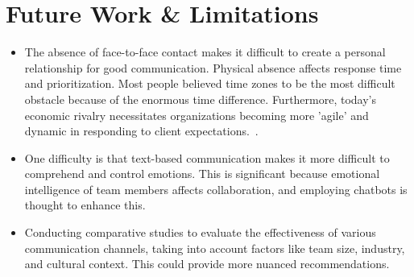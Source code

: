\documentclass{llncs}
\begin{document}
\section{Future Work \& Limitations}

\begin{itemize}

\item The absence of face-to-face contact makes it difficult to create a personal relationship for good communication. Physical absence affects response time and prioritization. Most people believed time zones to be the most difficult obstacle because of the enormous time difference. Furthermore, today's economic rivalry necessitates organizations becoming more 'agile' and dynamic in responding to client expectations.~\cite{refpaper10}. \\

\item One difficulty is that text-based communication makes it more difficult to comprehend and control emotions. This is significant because emotional intelligence of team members affects collaboration, and employing chatbots is thought to enhance this.~\cite{refpaper11} \\

\item Conducting comparative studies to evaluate the effectiveness of various communication channels, taking into account factors like team size, industry, and cultural context. This could provide more nuanced recommendations.

\end{itemize}
\end{document}
